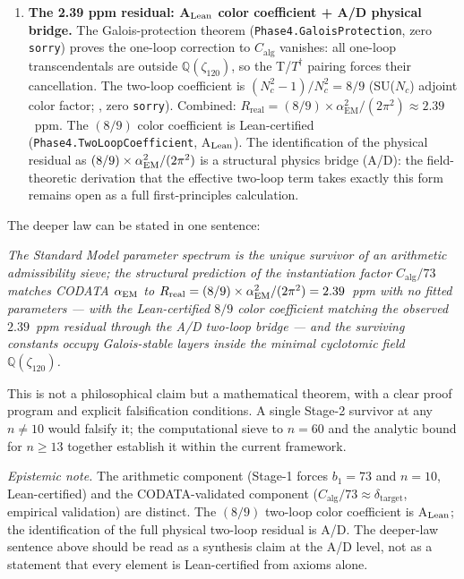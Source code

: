 \documentclass[11pt]{article}
\theoremstyle{remark}
\newcommand{\deltatar}{\delta_{\mathrm{target}}}
\newcommand{\Calg}{C_{\mathrm{alg}}}
\newcommand{\zetaN}[1]{\zeta_{#1}}
\begin{document}
\begin{enumerate}[leftmargin=2em]
  \item \textbf{The 2.39 ppm residual: A$_{\rm Lean}$ color coefficient + A/D physical bridge.}
    The Galois-protection theorem (\texttt{Phase4.GaloisProtection}, zero
    \texttt{sorry}) proves the one-loop correction to $\Calg$ vanishes: all one-loop
    transcendentals are outside $\mathbb{Q}(\zetaN{120})$, so the T/$T^\dagger$
    pairing forces their cancellation.
    The two-loop coefficient is $(N_c^2-1)/N_c^2 = 8/9$ (SU($N_c$) adjoint
    color factor; , zero \texttt{sorry}).
    \sloppy
    Combined: $R_{\mathrm{real}} = (8/9) \times \alpha_{\mathrm{EM}}^2/(2\pi^2)
    \approx 2.39$~ppm.  The $(8/9)$ color coefficient is Lean-certified (\texttt{Phase4.TwoLoopCoefficient}, A$_{\rm Lean}$).  The identification of the physical residual as $(8/9)\times\alpha_{\rm EM}^2/(2\pi^2)$ is a structural physics bridge (A/D): the field-theoretic derivation that the effective two-loop term takes exactly this form remains open as a full first-principles calculation.
\end{enumerate}

The deeper law can be stated in one sentence:

\begin{center}
\textit{The Standard Model parameter spectrum is the unique survivor of an
arithmetic admissibility sieve; the structural prediction of the instantiation
factor $\Calg/73$ matches CODATA $\alpha_{\rm EM}$ to
$R_{\mathrm{real}} = (8/9) \times \alpha_{\rm EM}^2/(2\pi^2) = 2.39$~ppm
with no fitted parameters --- with the Lean-certified $8/9$ color coefficient matching the observed $2.39$~ppm residual through the A/D two-loop bridge --- and the surviving constants occupy
Galois-stable layers inside the minimal cyclotomic field
$\mathbb{Q}(\zetaN{120})$.}
\end{center}

This is not a philosophical claim but a mathematical theorem, with a clear proof
program and explicit falsification conditions.
A single Stage-2 survivor at any $n \neq 10$ would falsify it; the computational
sieve to $n{=}60$ and the analytic bound for $n \geq 13$ together establish it
within the current framework.

\medskip
\noindent\textit{Epistemic note.} The arithmetic component (Stage-1 forces $b_1=73$ and $n=10$, Lean-certified) and the CODATA-validated component ($\Calg/73 \approx \deltatar$, empirical validation) are distinct.  The $(8/9)$ two-loop color coefficient is A$_{\rm Lean}$; the identification of the full physical two-loop residual is A/D.  The deeper-law sentence above should be read as a synthesis claim at the A/D level, not as a statement that every element is Lean-certified from axioms alone.
\end{document}
